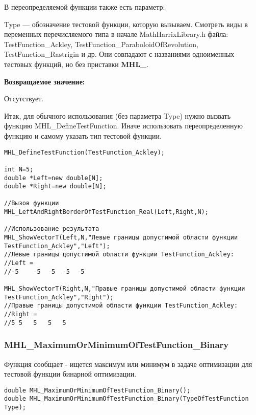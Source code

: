 \documentclass[a4paper,12pt]{article}
\begin{document}
В переопределяемой функции также есть параметр:
  
Type --- обозначение тестовой функции, которую вызываем.
Смотреть виды в переменных перечисляемого типа в начале MathHarrixLibrary.h файла: TestFunction\_Ackley, TestFunction\_ParaboloidOfRevolution, TestFunction\_Rastrigin и др. Они совпадают с названиями одноименных тестовых функций, но без приставки \textbf{MHL\_}.

\textbf{Возвращаемое значение:}
 
Отсутствует.

Итак, для обычного использования (без параметра Type) нужно вызвать функцию MHL\_DefineTestFunction. Иначе использовать переопределенную функцию и самому указать тип тестовой функции.


\begin{lstlisting}[label=code_use_MHL_LeftBorderOfTestFunction_Real,caption=Пример использования]
MHL_DefineTestFunction(TestFunction_Ackley);

int N=5;
double *Left=new double[N];
double *Right=new double[N];

//Вызов функции
MHL_LeftAndRightBorderOfTestFunction_Real(Left,Right,N);

//Использование результата
MHL_ShowVectorT(Left,N,"Левые границы допустимой области функции TestFunction_Ackley","Left");
//Левые границы допустимой области функции TestFunction_Ackley:
//Left =	
//-5	-5	-5	-5	-5

MHL_ShowVectorT(Right,N,"Правые границы допустимой области функции TestFunction_Ackley","Right");
//Правые границы допустимой области функции TestFunction_Ackley:
//Right =	
//5	5	5	5	5
\end{lstlisting}

\subsubsection{MHL\_MaximumOrMinimumOfTestFunction\_Binary}\label{MHL_MaximumOrMinimumOfTestFunction_Binary}

	Функция сообщает - ищется максимум или минимум в задаче оптимизации для тестовой функции бинарной оптимизации.


\begin{lstlisting}[label=code_syntax_MHL_MaximumOrMinimumOfTestFunction_Binary,caption=Синтаксис]
double MHL_MaximumOrMinimumOfTestFunction_Binary();
double MHL_MaximumOrMinimumOfTestFunction_Binary(TypeOfTestFunction Type);
\end{lstlisting}
\end{document}
